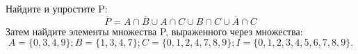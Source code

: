 \question
Найдите и упростите P:
\begin{equation*}
\overline{P} = A \cap \overline{B} \cup A \cap C \cup B \cap C \cup \overline{A} \cap C
\end{equation*}
Затем найдите элементы множества P, выраженного через множества:
\begin{equation*}
A = \{0, 3, 4, 9\}; 
B = \{1, 3, 4, 7\};
C = \{0, 1, 2, 4, 7, 8, 9\};
I = \{0, 1, 2, 3, 4, 5, 6, 7, 8, 9\}.
\end{equation*}